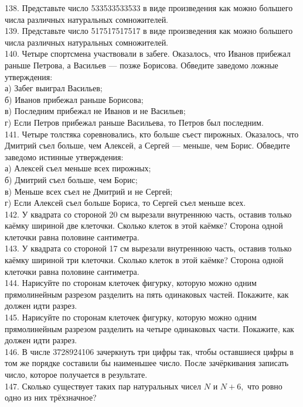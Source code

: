 \documentclass[12pt]{article}
\begin{document}
138. Представьте число 533533533533 в виде произведения как можно большего числа различных натуральных сомножителей.\\
139. Представьте число 517517517517 в виде произведения как можно большего числа различных натуральных сомножителей.\\
140. Четыре спортсмена участвовали в забеге. Оказалось, что Иванов прибежал раньше Петрова, а Васильев --- позже Борисова. Обведите заведомо ложные утверждения:\\
а) Забег выиграл Васильев;\\
б) Иванов прибежал раньше Борисова;\\
в) Последним прибежал не Иванов и не Васильев;\\
г) Если Петров прибежал раньше Васильева, то Петров был последним.\\
141. Четыре толстяка соревновались, кто больше съест пирожных. Оказалось, что Дмитрий съел больше, чем Алексей, а Сергей --- меньше, чем Борис. Обведите заведомо истинные утверждения:\\
а) Алексей съел меньше всех пирожных;\\
б) Дмитрий съел больше, чем Борис;\\
в) Меньше всех съел не Дмитрий и не Сергей;\\
г) Если Алексей съел больше Бориса, то Сергей съел меньше всех.\\
142. У квадрата со стороной 20 см вырезали внутреннюю часть, оставив только каёмку шириной две клеточки. Сколько клеток в этой каёмке? Сторона одной клеточки равна половине сантиметра.\\
143. У квадрата со стороной 17 см вырезали внутреннюю часть, оставив только каёмку шириной три клеточки. Сколько клеток в этой каёмке? Сторона одной клеточки равна половине сантиметра.\\
144. Нарисуйте по сторонам клеточек фигурку, которую можно одним прямолинейным разрезом разделить на пять одинаковых частей. Покажите, как должен идти разрез.\\
145. Нарисуйте по сторонам клеточек фигурку, которую можно одним прямолинейным разрезом разделить на четыре одинаковых части. Покажите, как должен идти разрез.\\
146. В числе 3728924106 зачеркнуть три цифры так, чтобы оставшиеся цифры в том же порядке составили бы наименьшее число. После зачёркивания записать число, которое получается в результате.\\
147. Сколько существует таких пар натуральных чисел $N$ и $N+6,$ что ровно одно из них трёхзначное?\\
\end{document}
